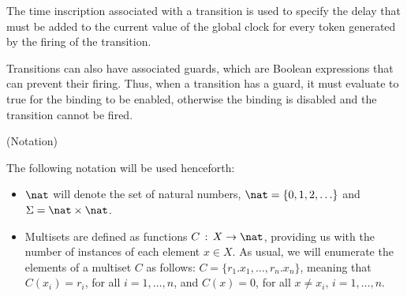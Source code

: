 The time inscription associated with a transition 
is used to specify the delay that must be added to the
current value of the global clock for
every token generated by the firing of the transition.

Transitions can also have associated guards, which
are Boolean expressions that can prevent their firing.
Thus, when a transition has a guard, it must evaluate to
true for the binding to be enabled,
otherwise the binding is disabled and 
the transition cannot be fired. 

\bdfn (Notation)

The following notation will be used henceforth:

\vspace*{-0.2cm}

\begin{itemize}
\item $\nat$ will denote the set of natural numbers,
$\nat=\{0,1,2,\ldots\}$ and $\Sigma = \nat \times \nat$.
%
\item Multisets are defined as functions $C\,:\,X \rightarrow \nat$,
providing us with the number of instances of each element $x\in X$.
As usual, we will enumerate the elements of a multiset $C$ as follows:
$C = \{ r_1.x_1,\ldots,r_n.x_n \}$, meaning that $C(x_i)=r_i$,
for all $i=1,\ldots,n$, and $C(x)=0$, for all $x \neq x_i, \, i=1,\ldots,n$.


\end{itemize}
